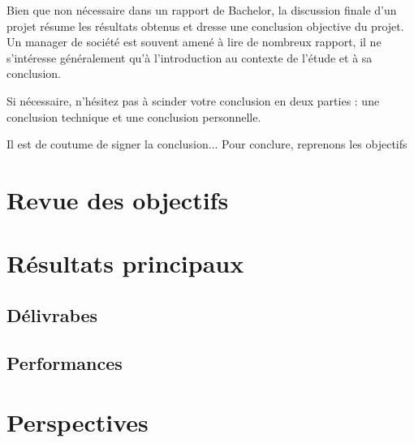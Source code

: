 Bien que non nécessaire dans un rapport de Bachelor, la discussion finale d'un projet résume les résultats obtenus et dresse une conclusion objective du projet. Un manager de société est souvent amené à lire de nombreux rapport, il ne s'intéresse généralement qu'à l'introduction au contexte de l'étude et à sa conclusion.

Si nécessaire, n'hésitez pas à scinder votre conclusion en deux parties : une conclusion technique et une conclusion personnelle.

Il est de coutume de signer la conclusion...
Pour conclure, reprenons les objectifs

\section{Revue des objectifs}
\section{Résultats principaux}
\subsection{Délivrabes}
\subsection{Performances}
\section{Perspectives}

\vfil
\hspace{8cm}\makeatletter\@author\makeatother\par
\hspace{8cm}\begin{minipage}{5cm}
    \printsignature
\end{minipage}